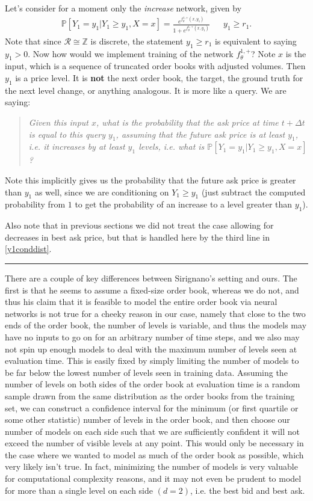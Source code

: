 \documentclass[12pt, reqno]{amsart}
\theoremstyle{definition}
\theoremstyle{definition}
\theoremstyle{plain}
\theoremstyle{definition}
\theoremstyle{remark}
\newcommand{\z}{\mathbb{Z}}				%
\newcommand{\bee}{\begin{equation}\begin{aligned}}
\newcommand{\eee}{\end{aligned}\end{equation}}
\newcommand{\fracc}{\frac}				%
\renewcommand{\geq}{\geqslant}			%
\renewcommand{\'}{\hspace{0.5mm}'}			%
\newcommand{\hrul}{\vspace{3mm}\hrule\vspace{3mm}}
\begin{document}
Let's consider for a moment only the \textit{increase} network, given by
\bee
	\mathbb{P}[Y_1 = y_1|Y_1 \geq y_1, X = x] 
		= \fracc{
			e^{f_\theta^{1,+}(x,y_1)}
		}{
			1 + e^{f_\theta^{1,+}(x,y_1)}
		} 
		&& y_1 \geq r_1.
\eee
Note that since $\mathcal{R} \cong \z$ is discrete, the statement $y_1 \geq r_1$ is equivalent to saying $y_1 > 0$. Now how would we implement training of the network $f_\theta^{1, +}$? Note $x$ is the input, which is a sequence of truncated order books with adjusted volumes. Then $y_1$ is a price level. It is \textbf{not} the next order book, the target, the ground truth for the next level change, or anything analogous. It is more like a query. We are saying:
\begin{quote}
	\textit{
		Given this input $x$, what is the probability that the ask price at time $t + \Delta t$ is equal to this query $y_1$, assuming that the future ask price is at least $y_1$, i.e. it increases by at least $y_1$ levels, i.e. what is $\mathbb{P}[Y_1 = y_1|Y_1 \geq y_1, X = x]$? 
	}
\end{quote}

Note this implicitly gives us the probability that the future ask price is greater than $y_1$ as well, since we are conditioning on $Y_1 \geq y_1$ (just subtract the computed probability from $1$ to get the probability of an increase to a level greater than $y_1$). 

Also note that in previous sections we did not treat the case allowing for decreases in best ask price, but that is handled here by the third line in \ref{y1conddist}. 

\hrul 

There are a couple of key differences between Sirignano's setting and ours. The first is that he seems to assume a fixed-size order book, whereas we do not, and thus his claim that it is feasible to model the entire order book via neural networks is not true for a cheeky reason in our case, namely that close to the two ends of the order book, the number of levels is variable, and thus the models may have no inputs to go on for an arbitrary number of time steps, and we also may not spin up enough models to deal with the maximum number of levels seen at evaluation time. This is easily fixed by simply limiting the number of models to be far below the lowest number of levels seen in training data. Assuming the number of levels on both sides of the order book at evaluation time is a random sample drawn from the same distribution as the order books from the training set, we can construct a confidence interval for the minimum (or first quartile or some other statistic) number of levels in the order book, and then choose our number of models on each side such that we are sufficiently confident it will not exceed the number of visible levels at any point. This would only be necessary in the case where we wanted to model as much of the order book as possible, which very likely isn't true. In fact, minimizing the number of models is very valuable for computational complexity reasons, and it may not even be prudent to model for more than a single level on each side $(d = 2)$, i.e. the best bid and best ask. 
\end{document}
